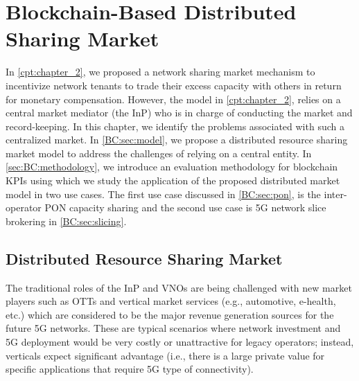 \chapter*{Blockchain-Based Distributed Sharing Market}

In \autoref{cpt:chapter_2}, we proposed a network sharing market mechanism to incentivize network tenants to trade their excess capacity with others in return for monetary compensation. However, the model in \autoref{cpt:chapter_2}, relies on a central market mediator (the \ac{InP}) who is in charge of conducting the market and record-keeping. In this chapter, we identify the problems associated with such a centralized market. In \autoref{BC:sec:model}, we propose a distributed resource sharing market model to address the challenges of relying on a central entity. 
In \autoref{sec:BC:methodology}, we introduce an evaluation methodology for blockchain \acp{KPI} using which we study the application of the proposed distributed market model in two use cases. The first use case discussed in \autoref{BC:sec:pon}, is the inter-operator \ac{PON} capacity sharing and the second use case is \ac{5G} network slice brokering in \autoref{BC:sec:slicing}.



\section{Distributed Resource Sharing Market}
\label{BC:sec:model}
The traditional roles of the \ac{InP} and \acp{VNO} are being challenged with new market players such as \acp{OTT} and vertical market services (e.g., automotive, e-health, etc.) which are considered to be the major revenue generation sources for the future \ac{5G} networks.
These are typical scenarios where network investment and \ac{5G} deployment would be very costly or unattractive for legacy operators; instead, verticals expect significant advantage (i.e., there is a large private value for specific applications that require \ac{5G} type of connectivity).

